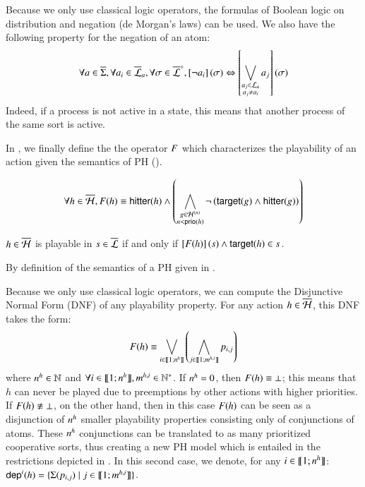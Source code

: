 Because we only use classical logic operators, the formulas of Boolean logic on distribution and negation (de Morgan's laws) can be used.
We also have the following property for the negation of an atom:
\[\forall a \in \overline{\Sigma}, \forall a_i \in \overline{\mathcal{L}}_a, \forall \sigma \in \overline{\mathcal{L}}^\diamond,
  \left[\neg a_i\right](\sigma) \Leftrightarrow \left[\bigvee_{\substack{a_j \in \mathcal{L}_a\\a_j \neq a_i}} a_j\right](\sigma)\]
Indeed, if a process is not active in a state, this means that another process of the same sort is active.

In , we finally define the the operator $F$ which characterizes the playability of an action
given the semantics of PH ().
\begin{definition}\label{def:fop}
  $$\forall h \in \overline{\mathcal{H}}, F(h) \equiv \mathsf{hitter}(h) \wedge
    \left( \bigwedge_{\substack{g \in \mathcal{H}^{(n)}\\n < \mathsf{prio}(h)}}
    \neg \left( \mathsf{target}(g) \wedge \mathsf{hitter}(g)\right) \right)$$
\end{definition}
%
\begin{theorem}
\label{th:ppplay}
  $h \in \overline{\mathcal{H}}$ is playable in $s \in \overline{\mathcal{L}}$ if and only if $\left[F(h)\right](s) \wedge \mathsf{target}(h) \in s$.
\end{theorem}
%
\begin{proofppplay}
  By definition of the semantics of a PH given in .
\end{proofppplay}

Because we only use classical logic operators, we can compute the Disjunctive Normal Form (DNF) of any playability property.
For any action $h \in \overline{\mathcal{H}}$, this DNF takes the form:
\[F(h) \equiv \bigvee_{i \in \llbracket 1; n^{h} \rrbracket} \left( \bigwedge_{j \in \llbracket 1; m^{h,i} \rrbracket} p_{i,j} \right)\]
where $n^{h} \in \mathbb{N}$ and $\forall i \in \llbracket 1; n^{h} \rrbracket, m^{h,i} \in \mathbb{N}^*$.
If $n^{h} = 0$, then $F(h) \equiv \bot$; this means that $h$ can never be played
due to preemptions by other actions with higher priorities.
If $F(h) \not\equiv \bot$, on the other hand, then in this case $F(h)$
can be seen as a disjunction of $n^{h}$ smaller playability properties consisting only of conjunctions of atoms.
These $n^{h}$ conjunctions can be translated to as many prioritized cooperative sorts,
thus creating a new PH model which is entailed in the restrictions depicted in .
In this second case, we denote, for any $i \in \llbracket 1; n^{h} \rrbracket$:
$\mathsf{dep}^{i}(h) = \{ \Sigma(p_{i,j}) \mid j \in \llbracket 1; m^{h,i} \rrbracket \}$.

